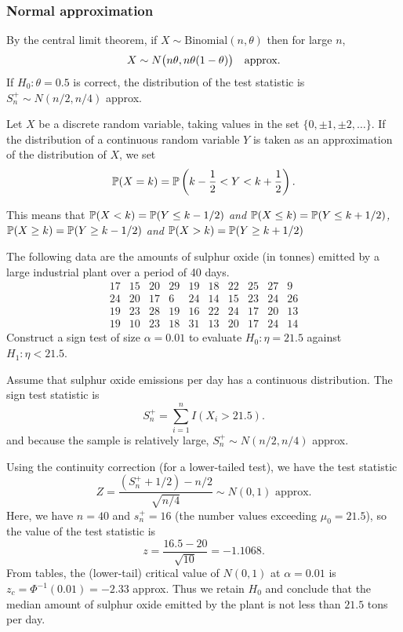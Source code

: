 \subsubsection{Normal approximation}

By the central limit theorem, if $X\sim\text{Binomial}(n,\theta)$ then for large $n$,
\[
X\sim N\big(n\theta,n\theta(1-\theta)\big) \text{\quad approx.}
\]
If $H_0:\theta=0.5$ is correct, the distribution of the test statistic is $S^{+}_n\sim N(n/2,n/4)$ approx.

\begin{definition}
Let $X$ be a discrete random variable, taking values in the set $\{0,\pm 1,\pm 2,\ldots\}$. If the distribution of a continuous random variable $Y$ is taken as an approximation of the distribution of $X$, we set
\[
\mathbb{P}(X=k) = \mathbb{P}\left(k - \frac{1}{2} < Y < k + \frac{1}{2}\right).
\] 
\end{definition}
This means that 
\bit
\it $\mathbb{P}(X < k) = \mathbb{P}(Y\leq k-1/2)$ and $\mathbb{P}(X\leq k) = \mathbb{P}(Y\leq k+1/2)$,
\it $\mathbb{P}(X\geq k) = \mathbb{P}(Y\geq k-1/2)$ and $\mathbb{P}(X > k) = \mathbb{P}(Y\geq k+1/2)$
\eit

\begin{example}
The following data are the amounts of sulphur oxide (in tonnes) emitted by a large industrial plant over a period of 40 days.
\[\begin{array}{cccccccccc}
17 & 15 & 20 & 29 & 19 & 18 & 22 & 25 & 27 &  9 \\
24 & 20 & 17 &  6 & 24 & 14 & 15 & 23 & 24 & 26 \\
19 & 23 & 28 & 19 & 16 & 22 & 24 & 17 & 20 & 13 \\
19 & 10 & 23 & 18 & 31 & 13 & 20 & 17 & 24 & 14
\end{array}\]
Construct a sign test of size $\alpha=0.01$ to evaluate $H_0:\eta=21.5$ against $H_1:\eta<21.5$.
\end{example}

\begin{solution}
Assume that sulphur oxide emissions per day has a continuous distribution. The sign test statistic is
\[
S^{+}_n = \sum_{i=1}^n I(X_i>21.5).
\]
and because the sample is relatively large, $S^{+}_n\sim N(n/2,n/4)$ approx.

\bigskip
Using the continuity correction (for a lower-tailed test), we have the test statistic
\[
Z = \displaystyle\frac{(S^{+}_n+1/2)-n/2}{\sqrt{n/4}} \sim N(0,1) \text{ approx.}
\]
Here, we have $n=40$ and $s^{+}_n=16$ (the number values exceeding $\mu_0 = 21.5$), so the value of the test statistic is
\[
z = \frac{16.5 - 20}{\sqrt{10}} = -1.1068.
\]
From tables, the (lower-tail) critical value of $N(0,1)$ at $\alpha=0.01$ is $z_c = \Phi^{-1}(0.01) = -2.33$ approx. Thus we retain $H_0$ and conclude that the median amount of sulphur oxide emitted by the plant is not less than $21.5$ tons per day.
\end{solution}

